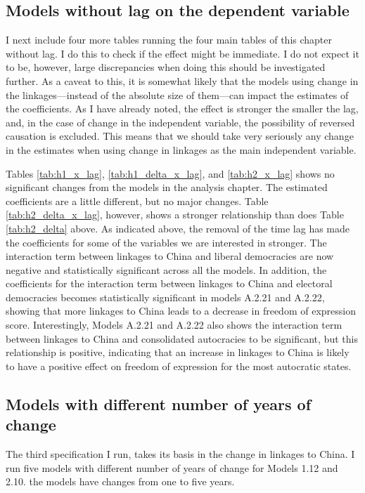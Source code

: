 \subsection{Models without lag on the dependent variable}
I next include four more tables running the four main tables of this chapter without lag. I do this to check if the effect might be immediate. I do not expect it to be, however, large discrepancies when doing this should be investigated further. As a caveat to this, it is somewhat likely that the models using change in the linkages---instead of the absolute size of them---can impact the estimates of the coefficients. As I have already noted, the effect is stronger the smaller the lag, and, in the case of change in the independent variable, the possibility of reversed causation is excluded. This means that we should take very seriously any change in the estimates when using change in linkages as the main independent variable.

Tables \ref{tab:h1_x_lag}, \ref{tab:h1_delta_x_lag}, and \ref{tab:h2_x_lag} shows no significant changes from the models in the analysis chapter. The estimated coefficients are a little different, but no major changes. Table \ref{tab:h2_delta_x_lag}, however, shows a stronger relationship than does Table \ref{tab:h2_delta} above. As indicated above, the removal of the time lag has made the coefficients for some of the variables we are interested in stronger. The interaction term between linkages to China and liberal democracies are now negative and statistically significant across all the models. In addition, the coefficients for the interaction term between linkages to China and electoral democracies becomes statistically significant in models A.2.21 and A.2.22, showing that more linkages to China leads to a decrease in freedom of expression score. Interestingly, Models A.2.21 and A.2.22 also shows the interaction term between linkages to China and consolidated autocracies to be significant, but this relationship is positive, indicating that an increase in linkages to China is likely to have a positive effect on freedom of expression for the most autocratic states.

\subsection{Models with different number of years of change}
The third specification I run, takes its basis in the change in linkages to China. I run five models with different number of years of change for Models 1.12 and 2.10. the models have changes from one to five years.


